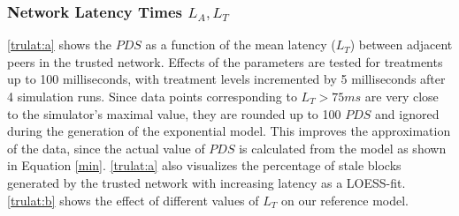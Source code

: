 \documentclass[a4paper,12pt,twoside]{report}
\begin{document}
\subsubsection{Network Latency Times $L_{A},L_T$}
\autoref{trulat:a} shows the $PDS$ as a function of the mean latency ($L_T$) between adjacent peers in the trusted network. Effects of the parameters are tested for treatments up to 100 milliseconds, with treatment levels incremented by 5 milliseconds after 4 simulation runs. Since data points corresponding to $L_T > 75ms$ are very close to the simulator's maximal value, they are rounded up to 100 $PDS$ and ignored during the generation of the exponential model. This improves the approximation of the data, since the actual value of $PDS$ is calculated from the model as shown in Equation \ref{min}. \autoref{trulat:a} also visualizes the percentage of stale blocks generated by the trusted network with increasing latency as a LOESS-fit. \autoref{trulat:b} shows the effect of different values of $L_T$ on our reference model.
\end{document}
